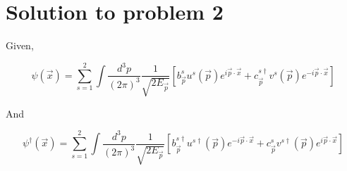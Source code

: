 \documentclass[12pt, letterpaper]{article}
\newcommand*{\1}{\hspace{1pt}}
\begin{document}
\section*{Solution to problem 2}

Given,

\begin{equation}
    \psi (\overrightarrow{x} ) = \sum_{s = 1}^{2} \int \frac{d ^{3} p}{(2 \pi) ^{3}} \frac{1}{\sqrt{2 E _{\overrightarrow{p}}}} \left[b^{s} _{\overrightarrow{p}}u^{s}(\overrightarrow{p}) e ^{i \overrightarrow{p} \cdot \overrightarrow{x}} + c^{s \dagger} _{\overrightarrow{p}}v^{s}(\overrightarrow{p}) e ^{ - i \overrightarrow{p} \cdot \overrightarrow{x}}\right]  
\end{equation}

And

\begin{equation}
    \psi ^{\dagger} (\overrightarrow{x} ) = \sum_{s = 1}^{2} \int \frac{d ^{3} p}{(2 \pi) ^{3}} \frac{1}{\sqrt{2 E _{\overrightarrow{p}}}} \left[b^{s \dagger} _{\overrightarrow{p}}u^{s \dagger}(\overrightarrow{p}) e ^{-i \overrightarrow{p} \cdot \overrightarrow{x}} + c^{s} _{\overrightarrow{p}}v^{s \dagger}(\overrightarrow{p}) e ^{i \overrightarrow{p} \cdot \overrightarrow{x}}\right]  
\end{equation}
\end{document}
